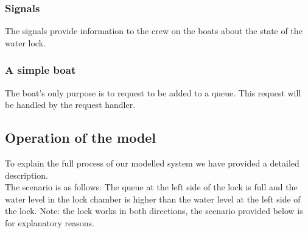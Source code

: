\documentclass{article}
\begin{document}
        \subsubsection{Signals}
            The signals provide information to the crew on the boats about the state of the water lock.
        \subsubsection{A simple boat}
            The boat's only purpose is to request to be added to a queue. This request will be handled by the request handler.
    
    \subsection{Operation of the model}
        To explain the full process of our modelled system we have provided a detailed description. \\
        The scenario is as follows: The queue at the left side of the lock is full and the water level in the lock chamber is higher than the water level at the left side of the lock. Note: the lock works in both directions, the scenario provided below is for explanatory reasons.
\end{document}
